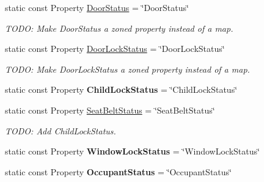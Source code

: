 \begin{DoxyCompactItemize}
\item 
\hypertarget{classVehicleProperty_aec1cd341d1eda388b27e5e2c167f377b}{static const Property \hyperlink{classVehicleProperty_aec1cd341d1eda388b27e5e2c167f377b}{Door\-Status} = \char`\"{}Door\-Status\char`\"{}}\label{classVehicleProperty_aec1cd341d1eda388b27e5e2c167f377b}

\begin{DoxyCompactList}\small\item\em T\-O\-D\-O\-: Make Door\-Status a zoned property instead of a map. \end{DoxyCompactList}\item 
\hypertarget{classVehicleProperty_a3d6b7274ee30b454864351c1c91bf694}{static const Property \hyperlink{classVehicleProperty_a3d6b7274ee30b454864351c1c91bf694}{Door\-Lock\-Status} = \char`\"{}Door\-Lock\-Status\char`\"{}}\label{classVehicleProperty_a3d6b7274ee30b454864351c1c91bf694}

\begin{DoxyCompactList}\small\item\em T\-O\-D\-O\-: Make Door\-Lock\-Status a zoned property instead of a map. \end{DoxyCompactList}\item 
\hypertarget{classVehicleProperty_a8da7bc1ecdd1b8d0ca6e96a708b00ab2}{static const Property {\bfseries Child\-Lock\-Status} = \char`\"{}Child\-Lock\-Status\char`\"{}}\label{classVehicleProperty_a8da7bc1ecdd1b8d0ca6e96a708b00ab2}

\item 
\hypertarget{classVehicleProperty_a6189236af616f7e8326ccb1b45d005c4}{static const Property \hyperlink{classVehicleProperty_a6189236af616f7e8326ccb1b45d005c4}{Seat\-Belt\-Status} = \char`\"{}Seat\-Belt\-Status\char`\"{}}\label{classVehicleProperty_a6189236af616f7e8326ccb1b45d005c4}

\begin{DoxyCompactList}\small\item\em T\-O\-D\-O\-: Add Child\-Lock\-Status. \end{DoxyCompactList}\item 
\hypertarget{classVehicleProperty_aa2db4c5710bc329bf294102a628e7c37}{static const Property {\bfseries Window\-Lock\-Status} = \char`\"{}Window\-Lock\-Status\char`\"{}}\label{classVehicleProperty_aa2db4c5710bc329bf294102a628e7c37}

\item 
\hypertarget{classVehicleProperty_a581909689c6ad9ffea21a4de61109150}{static const Property {\bfseries Occupant\-Status} = \char`\"{}Occupant\-Status\char`\"{}}\label{classVehicleProperty_a581909689c6ad9ffea21a4de61109150}


\end{DoxyCompactItemize}
